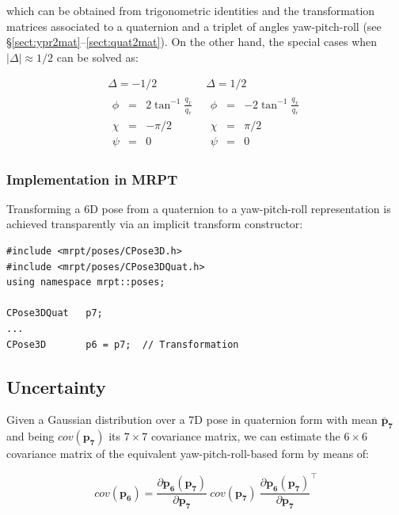 \documentclass[a4paper,11pt]{report}
\begin{document}
\noindent which can be obtained from trigonometric identities and
the transformation matrices associated to a quaternion and a triplet of angles yaw-pitch-roll
(see \S \ref{sect:ypr2mat}--\ref{sect:quat2mat}).
On the other hand, the special cases when $|\Delta| \approx 1/2$ can be solved as:

\begin{equation}
\begin{array}{c|c}
  \Delta = -1/2 & \Delta = 1/2 \\ \hline
  \begin{array}{rcl}
    \phi &=& 2 \tan^{-1} \frac{q_x}{q_r} \\
    \chi &=& -\pi /2 \\
    \psi &=& 0
  \end{array}
&
  \begin{array}{rcl}
    \phi &=& -2 \tan^{-1} \frac{q_x}{q_r} \\
    \chi &=& \pi /2 \\
    \psi &=& 0
  \end{array}
\end{array}
\label{eq:quat2ypr_2}
\end{equation}


\subsubsection{Implementation in MRPT}

Transforming a 6D pose from a quaternion to a yaw-pitch-roll representation is
achieved transparently via an implicit transform constructor:

\begin{lstlisting}
#include <mrpt/poses/CPose3D.h>
#include <mrpt/poses/CPose3DQuat.h>
using namespace mrpt::poses;

CPose3DQuat   p7;
...
CPose3D       p6 = p7;  // Transformation
\end{lstlisting}


\subsection{Uncertainty}

Given a Gaussian distribution over a 7D pose in quaternion form with
mean ${\mathbf{\bar{p}_7}}$ and being $cov(\mathbf{p_7})$ its $7 \times 7$ covariance matrix,
we can estimate the $6 \times 6$ covariance matrix of the equivalent yaw-pitch-roll-based
form by means of:

\begin{equation}
cov(\mathbf{p_6}) =
\frac{\partial \mathbf{p_6}(\mathbf{p_7}) }{\partial \mathbf{p_7}} ~
cov(\mathbf{p_7})  ~
\frac{\partial \mathbf{p_6}(\mathbf{p_7}) }{\partial \mathbf{p_7}}^\top
\end{equation}
\end{document}
